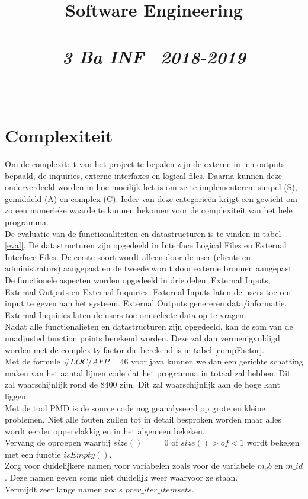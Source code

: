 \documentclass{article}
\title{\textmd{\textbf{Software Engineering}}\\\normalsize\vspace{0.1in}\Large{\assignmentname}\\\vspace{0.1in}\small{\textit{3 Ba INF \  2018-2019}}}
\author{\studentA \\ \studentB}
\begin{document}
\maketitle
\section{Complexiteit}
Om de complexiteit van het project te bepalen zijn de externe in- en outputs bepaald, de inquiries, externe interfaxes en logical files. Daarna kunnen deze onderverdeeld worden in hoe moeilijk het is om ze te implementeren: simpel (S), gemiddeld (A) en complex (C). Ieder van deze categorie\"en krijgt een gewicht om zo een numerieke waarde te kunnen bekomen voor de complexiteit van het hele programma.\\
De evaluatie van de functionaliteiten en datastructuren is te vinden in tabel \ref{eval}. De datastructuren zijn opgedeeld in Interface Logical Files en External Interface Files. De eerste soort wordt alleen door de user (clients en administrators) aangepast en de tweede wordt door externe bronnen aangepast. De functionele aspecten worden opgedeeld in drie delen: External Inputs, External Outputs en External Inquiries. External Inputs laten de users toe om input te geven aan het systeem. External Outputs genereren data/informatie. External Inquiries laten de users toe om selecte data op te vragen.\\
Nadat alle functionalieten en datastructuren zijn opgedeeld, kan de som van de unadjusted function points berekend worden. Deze zal dan vermenigvuldigd worden met de complexity factor die berekend is in tabel \ref{compFactor}.\\
Met de formule $\#LOC/AFP = 46$ voor java kunnen we dan een gerichte schatting maken van het aantal lijnen code dat het programma in totaal zal hebben. Dit zal waarschijnlijk rond de 8400 zijn. Dit zal waarschijnlijk aan de hoge kant liggen.\\
Met de tool PMD is de source code nog geanalyseerd op grote en kleine problemen. Niet alle fouten zullen tot in detail besproken worden maar alles wordt eerder oppervlakkig en in het algemeen bekeken.\\
Vervang de oproepen waarbij $size() == 0$ of $size() > of < 1$ wordt bekeken met een functie $isEmpty()$.\\
Zorg voor duidelijkere namen voor variabelen zoals voor de variabele $m_db$ en $m\_id$. Deze namen geven soms niet duidelijk weer waarvoor ze staan.\\
Vermijdt zeer lange namen zoals $prev\_iter\_itemsets$.\\
\end{document}
